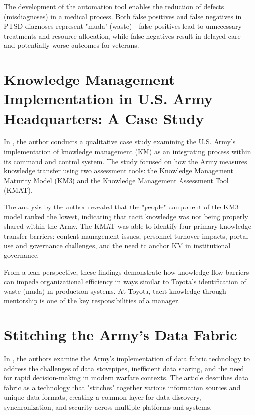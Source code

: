 \documentclass{article}
\begin{document}
		The development of the automation tool enables the reduction of defects (misdiagnoses) in a medical process.
	 	Both false positives and false negatives in PTSD diagnoses represent "muda" (waste) - false positives lead to unnecessary treatments and resource allocation, while false negatives result in delayed care and potentially worse outcomes for veterans.


		\section{Knowledge Management Implementation in U.S. Army Headquarters: A Case Study \cite{VanLaar2023}}

		In \cite{VanLaar2023}, the author conducts a qualitative case study examining the U.S. Army's implementation of knowledge management (KM) as an integrating process within its command and control system. 
		The study focused on how the Army measures knowledge transfer using two assessment tools: the Knowledge Management Maturity Model (KM3) and the Knowledge Management Assessment Tool (KMAT). 

		The analysis by the author revealed that the "people" component of the KM3 model ranked the lowest, indicating that tacit knowledge was not being properly shared within the Army.
		The KMAT was able to identify four primary knowledge transfer barriers: content management issues, personnel turnover impacts, portal use and governance challenges, and the need to anchor KM in institutional governance.

		From a lean perspective, these findings demonstrate how knowledge flow barriers can impede organizational efficiency in ways similar to Toyota's identification of waste (muda) in production systems. 
		At Toyota, tacit knowledge through mentorship is one of the key responsibilities of a manager.


	\section{Stitching the Army's Data Fabric \cite{Patel2021}}

		In \cite{Patel2021}, the authors examine the Army's implementation of data fabric technology to address the challenges of data stovepipes, inefficient data sharing, and the need for rapid decision-making in modern warfare contexts.
		The article describes data fabric as a technology that "stitches" together various information sources and unique data formats, creating a common layer for data discovery, synchronization, and security across multiple platforms and systems.
\end{document}
